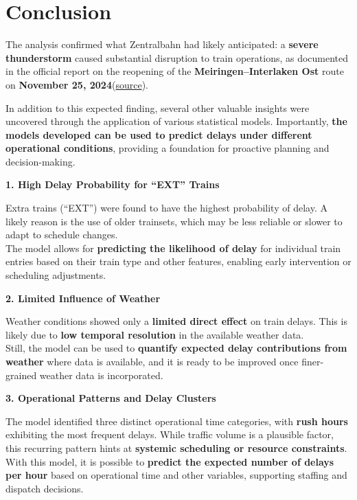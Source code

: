 \documentclass[
]{article}
\begin{document}
\section{Conclusion}\label{conclusion-1}

The analysis confirmed what Zentralbahn had likely anticipated: a
\textbf{severe thunderstorm} caused substantial disruption to train
operations, as documented in the official report on the reopening of the
\textbf{Meiringen--Interlaken Ost} route on \textbf{November 25,
2024}(\href{https://www.zentralbahn.ch/de/kennenlernen/die-zentralbahn/einblicke/wiedereroeffnung-der-strecke-meiringen-interlaken-ost-am-25-november-2024}{source}).

In addition to this expected finding, several other valuable insights
were uncovered through the application of various statistical models.
Importantly, \textbf{the models developed can be used to predict delays
under different operational conditions}, providing a foundation for
proactive planning and decision-making.

\textbf{1. High Delay Probability for ``EXT'' Trains}

Extra trains (``EXT'') were found to have the highest probability of
delay. A likely reason is the use of older trainsets, which may be less
reliable or slower to adapt to schedule changes.\\
The model allows for \textbf{predicting the likelihood of delay} for
individual train entries based on their train type and other features,
enabling early intervention or scheduling adjustments.

\textbf{2. Limited Influence of Weather}

Weather conditions showed only a \textbf{limited direct effect} on train
delays. This is likely due to \textbf{low temporal resolution} in the
available weather data.\\
Still, the model can be used to \textbf{quantify expected delay
contributions from weather} where data is available, and it is ready to
be improved once finer-grained weather data is incorporated.

\textbf{3. Operational Patterns and Delay Clusters}

The model identified three distinct operational time categories, with
\textbf{rush hours} exhibiting the most frequent delays. While traffic
volume is a plausible factor, this recurring pattern hints at
\textbf{systemic scheduling or resource constraints}.\\
With this model, it is possible to \textbf{predict the expected number
of delays per hour} based on operational time and other variables,
supporting staffing and dispatch decisions.
\end{document}
